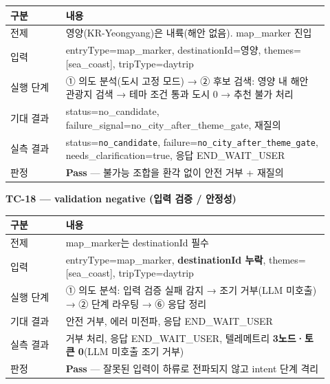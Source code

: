 \documentclass[11pt,a4paper]{article}
\begin{document}
\begin{small}
\begin{longtable}{@{}>{\RaggedRight\arraybackslash}m{0.160\linewidth}>{\RaggedRight\arraybackslash}m{0.760\linewidth}@{}}
\toprule\noalign{}
구분 & 내용 \\
\midrule\noalign{}
\endhead
\bottomrule\noalign{}
\endlastfoot
전제 & 영양(KR-Yeongyang)은 내륙(해안 없음). map\_marker 진입 \\
입력 & entryType=map\_marker, destinationId=영양, themes={[}sea\_coast{]}, tripType=daytrip \\
실행 단계 & ① 의도 분석(도시 고정 모드) → ② 후보 검색: 영양 내 해안 관광지 검색 → 테마 조건 통과 도시 0 → 추천 불가 처리 \\
기대 결과 & status=no\_candidate, failure\_signal=no\_city\_after\_theme\_gate, 재질의 \\
실측 결과 & status=\texttt{no\_\allowbreak{}candidate}, failure=\texttt{no\_\allowbreak{}city\_\allowbreak{}after\_\allowbreak{}theme\_\allowbreak{}gate}, needs\_clarification=true, 응답 END\_WAIT\_USER \\
판정 & \textbf{Pass} --- 불가능 조합을 환각 없이 안전 거부 + 재질의 \\
\end{longtable}
\end{small}

\textbf{TC-18 --- validation negative (입력 검증 / 안정성)}

\begin{small}
\begin{longtable}{@{}>{\RaggedRight\arraybackslash}m{0.160\linewidth}>{\RaggedRight\arraybackslash}m{0.760\linewidth}@{}}
\toprule\noalign{}
구분 & 내용 \\
\midrule\noalign{}
\endhead
\bottomrule\noalign{}
\endlastfoot
전제 & map\_marker는 destinationId 필수 \\
입력 & entryType=map\_marker, \textbf{destinationId 누락}, themes={[}sea\_coast{]}, tripType=daytrip \\
실행 단계 & ① 의도 분석: 입력 검증 실패 감지 → 조기 거부(LLM 미호출) → ② 단계 라우팅 → ⑥ 응답 정리 \\
기대 결과 & 안전 거부, 에러 미전파, 응답 END\_WAIT\_USER \\
실측 결과 & 거부 처리, 응답 END\_WAIT\_USER, 텔레메트리 \textbf{3노드·토큰 0}(LLM 미호출 조기 거부) \\
판정 & \textbf{Pass} --- 잘못된 입력이 하류로 전파되지 않고 intent 단계 격리 \\
\end{longtable}
\end{small}
\end{document}

